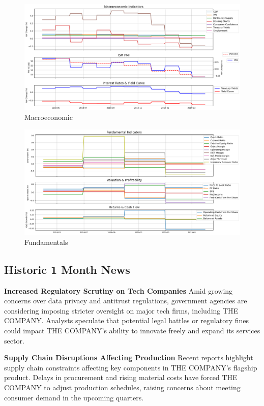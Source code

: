 \documentclass[8pt]{scrartcl}
\begin{document}
\begin{figure}[H]
    \centering
    \includegraphics[width=1\linewidth]{judge_reviews/AAPL_M_gpt-4o-mini/2019-04-01/judge_Macroeconomic_Indicators.png}
    \caption{Macroeconomic}
\end{figure}

\begin{figure}[H]
    \centering
    \includegraphics[width=1\linewidth]{judge_reviews/AAPL_M_gpt-4o-mini/2019-04-01/judge_Fundamental_Indicators.png}
    \caption{Fundamentals}
\end{figure}


\subsection*{Historic 1 Month News}

\textbf{Increased Regulatory Scrutiny on Tech Companies}
Amid growing concerns over data privacy and antitrust regulations, government agencies are considering imposing stricter oversight on major tech firms, including THE COMPANY. Analysts speculate that potential legal battles or regulatory fines could impact THE COMPANY’s ability to innovate freely and expand its services sector.

\textbf{Supply Chain Disruptions Affecting Production}
Recent reports highlight supply chain constraints affecting key components in THE COMPANY’s flagship product. Delays in procurement and rising material costs have forced THE COMPANY to adjust production schedules, raising concerns about meeting consumer demand in the upcoming quarters.
\end{document}

